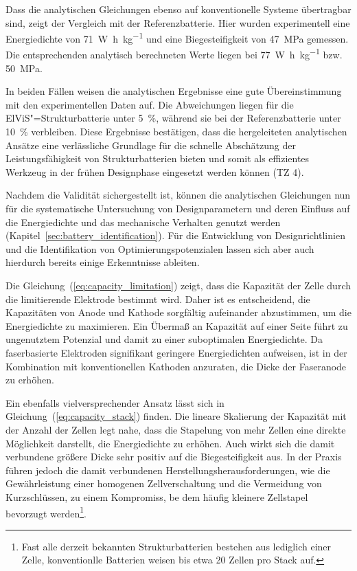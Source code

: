 Dass die analytischen Gleichungen ebenso auf konventionelle Systeme übertragbar sind, zeigt der Vergleich mit der Referenzbatterie. Hier wurden experimentell eine Energiedichte von 71~\unit{\watt\hour\per\kilo\gram} und eine Biegesteifigkeit von 47~\unit{\mega\pascal} gemessen. Die entsprechenden analytisch berechneten Werte liegen bei 77~\unit{\watt\hour\per\kilo\gram} bzw. 50~\unit{\mega\pascal}.



In beiden Fällen weisen die analytischen Ergebnisse eine gute Übereinstimmung mit den experimentellen Daten auf. Die Abweichungen liegen für die ElViS"=Strukturbatterie unter 5~\%, während sie bei der Referenzbatterie unter 10~\% verbleiben. Diese Ergebnisse bestätigen, dass die hergeleiteten analytischen Ansätze eine verlässliche Grundlage für die schnelle Abschätzung der Leistungsfähigkeit von Strukturbatterien bieten und somit als effizientes Werkzeug in der frühen Designphase eingesetzt werden können (TZ 4).

Nachdem die Validität sichergestellt ist, können die analytischen Gleichungen nun für die systematische Untersuchung von Designparametern und deren Einfluss auf die Energiedichte und das mechanische Verhalten genutzt werden (Kapitel~\ref{sec:battery_identification}). Für die Entwicklung von Designrichtlinien und die Identifikation von Optimierungspotenzialen lassen sich aber auch hierdurch bereits einige Erkenntnisse ableiten. 

Die Gleichung~(\ref{eq:capacity_limitation}) zeigt, dass die Kapazität der Zelle durch die limitierende Elektrode bestimmt wird. Daher ist es entscheidend, die Kapazitäten von Anode und Kathode sorgfältig aufeinander abzustimmen, um die Energiedichte zu maximieren. Ein Übermaß an Kapazität auf einer Seite führt zu ungenutztem Potenzial und damit zu einer suboptimalen Energiedichte. Da faserbasierte Elektroden signifikant geringere Energiedichten aufweisen, ist in der Kombination mit konventionellen Kathoden anzuraten, die Dicke der Faseranode zu erhöhen. 

Ein ebenfalls vielversprechender Ansatz lässt sich in Gleichung~(\ref{eq:capacity_stack}) finden. Die lineare Skalierung der Kapazität mit der Anzahl der Zellen legt nahe, dass die Stapelung von mehr Zellen eine direkte Möglichkeit darstellt, die Energiedichte zu erhöhen. Auch wirkt sich die damit verbundene größere Dicke sehr positiv auf die Biegesteifigkeit aus. In der Praxis führen jedoch die damit verbundenen Herstellungsherausforderungen, wie die Gewährleistung einer homogenen Zellverschaltung und die Vermeidung von Kurzschlüssen, zu einem Kompromiss, be dem häufig kleinere Zellstapel bevorzugt werden\footnote{Fast alle derzeit bekannten Strukturbatterien bestehen aus lediglich einer Zelle, konventionlle Batterien weisen bis etwa 20 Zellen pro Stack auf.}.

